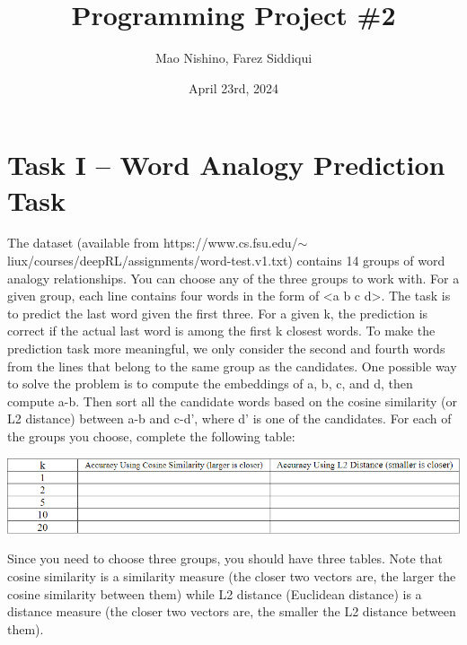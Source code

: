 \documentclass[
	12pt, %
]{../Template/fphw}
\title{Programming Project \#2} %
\author{Mao Nishino, Farez Siddiqui} %
\date{April 23rd, 2024} %
\institute{Florida State University \\ Department of Computer Science} %
\begin{document}
\maketitle %


\section*{Task I – Word Analogy Prediction Task}
\begin{problem}
The dataset (available from https://www.cs.fsu.edu/$\sim$ liux/courses/deepRL/assignments/word-test.v1.txt) contains 14 groups of word analogy relationships. You can choose any of the three groups to work with. For a given group, each line contains four words in the form of <a b c d>. The task is to predict the last word given the first three. For a given k, the prediction is correct if the actual last word is among the first k closest words. To make the prediction task more meaningful, we only consider the second and fourth words from the lines that belong to the same group as the candidates. One possible way to solve the problem is to compute the embeddings of a, b, c, and d, then compute a-b. Then sort all the candidate words based on the cosine similarity (or L2 distance) between a-b and c-d', where d' is one of the candidates. For each of the groups you choose, complete the following table:

\includegraphics[width=\textwidth]{P2/table_task_1.png}

Since you need to choose three groups, you should have three tables. Note that cosine similarity is a similarity measure (the closer two vectors are, the larger the cosine similarity between them) while L2 distance (Euclidean distance) is a distance measure (the closer two vectors are, the smaller the L2 distance between them).
\end{problem}

\end{document}
